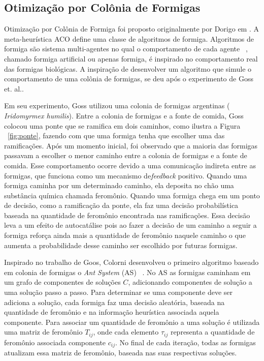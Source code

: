 \subsection{Otimização por Colônia de Formigas}

Otimização por Colônia de Formiga foi proposto originalmente por Dorigo em
\cite{aco-origin}. A meta-heurística ACO define uma classe de algoritmos
de formiga. Algoritmos de formiga são sistema multi-agentes no qual o
comportamento de cada agente ~\cite{aco-origin2}, chamado formiga artificial
ou apenas formiga, é inspirado no comportamento real das formigas biológicas.
A inspiração de desenvolver um algoritmo que simule o comportamento de uma
colônia de formigas, se deu após o experimento de Goss et. al.\cite{Goss}.

Em seu experimento, Goss utilizou uma colonia de formigas argentinas ({\it
Iridomyrmex humilis}). Entre a colonia de formigas e a fonte de comida, Goss
colocou uma ponte que se ramifica em dois caminhos, como ilustra a Figura
~\ref{fig:ponte}, fazendo com que uma formiga tenha que escolher uma das
ramificações. Após um momento inicial, foi observado que a maioria das
formigas passavam a escolher o menor caminho entre a colonia de formigas
e a fonte de comida. Esse comportamento ocorre devido a uma comunicação
indireta entre as formigas, que funciona como um mecanismo de{\it feedback}
positivo. Quando uma formiga caminha por um determinado caminho, ela deposita
no chão uma substância química chamada feromônio. Quando uma formiga
chega em um ponto de decisão, como a ramificação da ponte, ela faz uma
decisão probabilística baseada na quantidade de feromônio encontrada
nas ramificações. Essa decisão leva a um efeito de autocatálise pois
ao fazer a decisão de um caminho a seguir a formiga reforça ainda mais a
quantidade de feromônio naquele caminho o que aumenta a probabilidade desse
caminho ser escolhido por futuras formigas.

Inspirado no trabalho de Goos, Colorni desenvolveu o primeiro algoritmo
baseado em colonia de formigas o {\it Ant System} (AS) ~\cite{as-origin}.
No AS as formigas caminham em um grafo de componentes de soluções $C$,
adicionando componentes de solução a uma solução passo a passo. Para
determinar se uma componente deve ser adiciona a solução, cada formiga
faz uma decisão aleatória, baseada na quantidade de feromônio e
na informação heurística associada aquela componente. Para associar um
quantidade de feromônio a uma solução é utilizada uma matriz de feromônio
$T_{ij}$, onde cada elemento $\tau_{ij}$ representa a quantidade de feromônio
associada componente $c_{ij}$. No final de cada iteração, todas as formigas
atualizam essa matriz de feromônio, baseada nas suas respectivas soluções.

